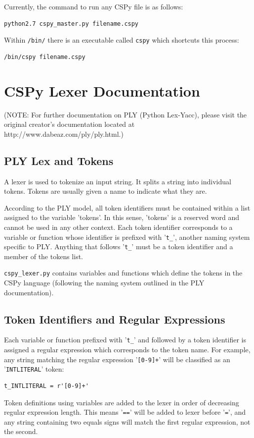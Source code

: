\documentclass{article}
\begin{document}
Currently, the command to run any CSPy file is as follows:
\begin{verbatim}
python2.7 cspy_master.py filename.cspy
\end{verbatim}
Within \verb|/bin/| there is an executable called \verb|cspy| which shortcuts this process:
\begin{verbatim}
/bin/cspy filename.cspy
\end{verbatim}
\pagebreak

\section{CSPy Lexer Documentation}
(NOTE: For further documentation on PLY (Python Lex-Yacc), please visit the original creator's documentation located at http://www.dabeaz.com/ply/ply.html.)
\subsection{PLY Lex and Tokens}
A lexer is used to tokenize an input string. It splits a string into individual tokens. Tokens are usually given a name to indicate what they are.

According to the PLY model, all token identifiers must be contained within a list assigned to the variable 'tokens'. In this sense, 'tokens' is a reserved word and cannot be used in any other context. Each token identifier corresponds to a variable or function whose identifier is prefixed with '\verb|t_|', another naming system specific to PLY. Anything that follows '\verb|t_|' must be a token identifier and a member of the tokens list. 

\verb|cspy_lexer.py| contains variables and functions which define the tokens in the CSPy language (following the naming system outlined in the PLY documentation). 

\subsection{Token Identifiers and Regular Expressions}
Each variable or function prefixed with '\verb|t_|' and followed by a token identifier is assigned a regular expression which corresponds to the token name. For example, any string matching the regular expression '\verb|[0-9]+|' will be classified as an '\verb|INTLITERAL|' token:
\begin{verbatim}
t_INTLITERAL = r'[0-9]+'
\end{verbatim}
Token definitions using variables are added to the lexer in order of decreasing regular expression length. This means '\verb|==|' will be added to lexer before '\verb|=|', and any string containing two equals signs will match the first regular expression, not the second. 
\end{document}
